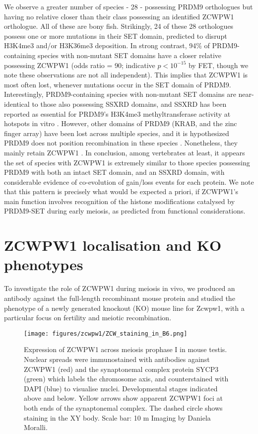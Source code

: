 We observe a greater number of species - 28 - possessing PRDM9 orthologues but having no relative closer than their class possessing an identified ZCWPW1 orthologue.
All of these are bony fish.
Strikingly, 24 of these 28 orthologues possess one or more mutations in their SET domain\iffalse supp table \fi, predicted to disrupt H3K4me3 and/or H3K36me3 deposition.
In strong contrast, 94\% of PRDM9-containing species with non-mutant SET domains have a closer relative possessing ZCWPW1 (odds ratio = 90; indicative $p < 10^{-15}$ by FET, though we note these observations are not all independent).
This implies that ZCWPW1 is most often lost, whenever mutations occur in the SET domain of PRDM9.
Interestingly, PRDM9-containing species with non-mutant SET domains are near-identical to those also possessing SSXRD domains, and SSXRD has been reported as essential for PRDM9’s H3K4me3 methyltransferase activity at hotspots in vitro \parencite{Thibault-Sennett2018Interrogating}.
However, other domains of PRDM9 (KRAB, and the zinc finger array) have been lost across multiple species, and it is hypothesized PRDM9 does not position recombination in these species \parencite{Baker2017Repeated}.
Nonetheless, they mainly retain ZCWPW1 \iffalse supp table \fi.
In conclusion, among vertebrates at least, it appears the set of species with ZCWPW1 is extremely similar to those species possessing PRDM9 with both an intact SET domain, and an SSXRD domain, with considerable evidence of co-evolution of gain/loss events for each protein.
We note that this pattern is precisely what would be expected a priori, if ZCWPW1’s main function involves recognition of the histone modifications catalysed by PRDM9-SET during early meiosis, as predicted from functional considerations.

\section{ZCWPW1 localisation and  KO phenotypes} %
To investigate the role of ZCWPW1 during meiosis in vivo, we produced an antibody against the full-length recombinant mouse protein \iffalse supp fig 2 \fi and studied the phenotype of a newly generated knockout (KO) mouse line for Zcwpw1, with a particular focus on fertility and meiotic recombination.

\begin{figure}[H]
	\centering
	\texttt{[image: figures/zcwpw1/ZCW\_staining\_in\_B6.png]}
	\caption[Zcwpw1 Expression]{
		Expression of ZCWPW1 across meiosis prophase I in mouse testis.
		Nuclear spreads were immunostained with antibodies against ZCWPW1 (red) and the synaptonemal complex protein SYCP3 (green) which labels the chromosome axis, and counterstained with DAPI (blue) to visualise nuclei.
		Developmental stages indicated above and below.
		Yellow arrows show apparent ZCWPW1 foci at both ends of the synaptonemal complex.
		The dashed circle shows staining in the XY body.
		Scale bar: 10 \textmu m
		Imaging by Daniela Moralli.
	}
	\label{fig:ZCWPW1_expression}
\end{figure}

